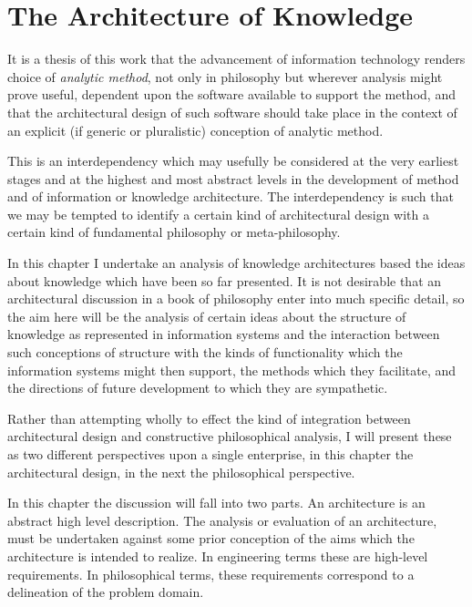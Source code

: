 
\chapter{The Architecture of Knowledge}\label{ArchitectureKnowledge}

It is a thesis of this work that the advancement of information
technology renders choice of \emph{analytic method}, not only in
philosophy but wherever analysis might prove useful, dependent upon
the software available to support the method, and that the
architectural design of such software should take place in the context
of an explicit (if generic or pluralistic) conception of analytic method.

This is an interdependency which may usefully be considered at the
very earliest stages and at the highest and most abstract levels in
the development of method and of information or knowledge architecture.
The interdependency is such that we may be tempted to identify a
certain kind of architectural design with a certain kind of fundamental
philosophy or meta-philosophy.

In this chapter I undertake an analysis of knowledge architectures based
the ideas about knowledge which have been so far presented.
It is not desirable that an architectural discussion in a book of
philosophy enter into much specific detail, so the aim here will be
the analysis of certain ideas about the structure of knowledge as
represented in information systems and the interaction between such
conceptions of structure with the kinds of functionality which the
information systems might then support, the methods which they
facilitate, and the directions of future development to which they are
sympathetic.

Rather than attempting wholly to effect the kind of integration
between architectural design and constructive philosophical analysis,
I will present these as two different perspectives upon a single
enterprise, in this chapter the architectural design, in the next the
philosophical perspective.

In this chapter the discussion will fall into two parts.
An architecture is an abstract high level description.
The analysis or evaluation of an architecture, must be undertaken
against some prior conception of the aims which the architecture is
intended to realize.
In engineering terms these are high-level requirements.
In philosophical terms, these requirements correspond to a delineation
of the problem domain.

